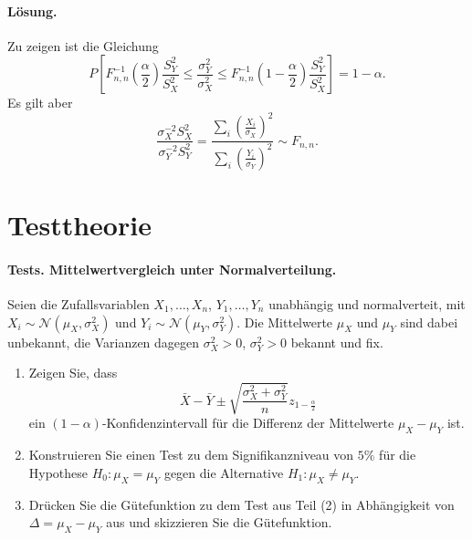 \paragraph*{Lösung.} Zu zeigen ist die Gleichung
\begin{equation*}
    P \left[ F^{-1}_{n,n} \left( \frac{\alpha}{2} \right) \frac{S_Y^2}{S_X^2} \leq 
    \frac{\sigma^2_Y}{\sigma^2_X} \leq
    F^{-1}_{n,n} \left( 1 - \frac{\alpha}{2}  \right) \frac{S_Y^2}{S_X^2}     \right]
    = 1-\alpha.
\end{equation*}
Es gilt aber 
\begin{equation*}
    \frac{\sigma^{-2}_X S^2_X  }{ \sigma^{-2}_Y S^2_Y} = 
    \frac{\sum_{i}^{} \left( \frac{X_i}{\sigma_X} \right)^2  }{ \sum_{i}^{} \left( \frac{Y_i}{\sigma_Y} \right)^2 } \sim F_{n,n}.
\end{equation*}


\section{Testtheorie}

\paragraph{Tests. Mittelwertvergleich unter Normalverteilung. } 
Seien die Zufallsvariablen $X_1,\ldots,X_n$, $Y_1,\ldots,Y_n$ unabhängig und normalverteit, 
mit $X_i\sim\mathcal N(\mu_X, \sigma^2_X)$ und $Y_i\sim\mathcal N(\mu_Y, \sigma^2_Y)$.
Die Mittelwerte $\mu_X$ und $\mu_Y$ sind dabei unbekannt, die Varianzen dagegen
$\sigma_X^2>0$, $\sigma^2_Y>0$ bekannt und fix.
\begin{enumerate}
    \item Zeigen Sie, dass 
        \begin{equation}
            \bar X - \bar Y \pm \sqrt{ \frac{\sigma^2_X + \sigma^2_Y}{n}  }z_{1-\frac{\alpha}{2}}
        \end{equation}
        ein $(1-\alpha)$-Konfidenzintervall für die Differenz der Mittelwerte $\mu_X - \mu_Y$ ist.
    \item Konstruieren Sie einen Test zu dem Signifikanzniveau von $5\%$ für die Hypothese
        $H_0: \mu_X = \mu_Y$ gegen die Alternative $H_1: \mu_X \neq \mu_Y$.
    \item Drücken Sie die Gütefunktion zu dem Test aus Teil (2) in Abhängigkeit von
        $\Delta = \mu_X -\mu_Y$ aus und skizzieren Sie die Gütefunktion. 
\end{enumerate}


